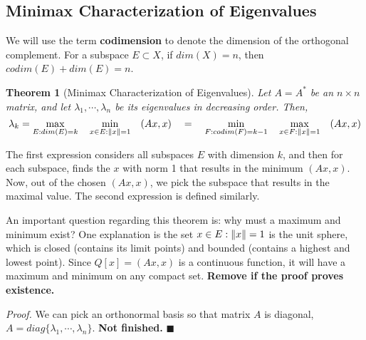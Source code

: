 \documentclass[a4paper,10pt]{book}
\theoremstyle{plain}
\newtheorem{theorem}{Theorem}[section]
\renewenvironment{proof}{\textsl{Proof.}}{\hfill$\blacksquare$}
\theoremstyle{plain}
\theoremstyle{definition}
\begin{document}
\subsection{Minimax Characterization of Eigenvalues}

We will use the term \textbf{codimension} to denote the dimension of the orthogonal complement. For a subspace $E \subset X$, if $dim(X) = n$, then $codim(E) + dim(E) = n$. 

\begin{theorem}[Minimax Characterization of Eigenvalues]
Let $A = A^{*}$ be an $n \times n$ matrix, and let $\lambda_{1}, \cdots, \lambda_{n}$ be its eigenvalues in decreasing order. Then, 
$$\lambda_{k} = \max_{E: dim(E) = k} \quad \min_{x \in E: \norm{x} = 1} \quad (Ax, x) \quad = \quad \min_{F: codim(F)=k-1} \quad \max_{x \in F: \norm{x} = 1} \quad (Ax, x)$$

\end{theorem}

The first expression considers all subspaces $E$ with dimension $k$, and then for each subspace, finds the $x$ with norm 1 that results in the minimum $(Ax, x)$. Now, out of the chosen $(Ax, x)$, we pick the subspace that results in the maximal value. The second expression is defined similarly. 

An important question regarding this theorem is: why must a maximum and minimum exist? One explanation is the set $x \in E : \norm{x} = 1$ is the unit sphere, which is closed (contains its limit points) and bounded (contains a highest and lowest point). Since $Q[x] = (Ax, x)$ is a continuous function, it will have a maximum and minimum on any compact set. \textbf{Remove if the proof proves existence.}

\begin{proof}
We can pick an orthonormal basis so that matrix $A$ is diagonal, $A = diag\{ \lambda_{1}, \cdots, \lambda_{n} \}$. \textbf{Not finished.}
\end{proof}
\end{document}
